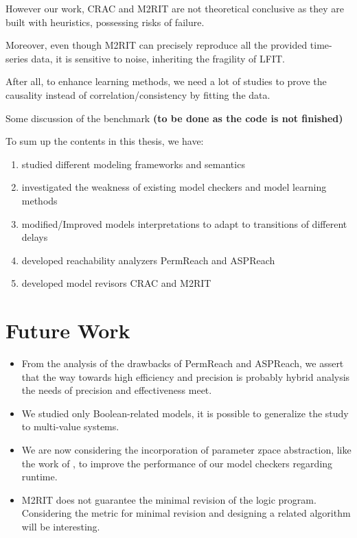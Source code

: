 However our work, CRAC and M2RIT are not theoretical conclusive as they are built with heuristics, possessing risks of failure.

Moreover, even though M2RIT can precisely reproduce all the provided time-series data, it is sensitive to noise, inheriting the fragility of LFIT.

After all, to enhance learning methods, we need a lot of studies to prove the causality instead of correlation/consistency by fitting the data.

Some discussion of the benchmark \textbf{(to be done as the code is not finished)}

To sum up the contents in this thesis, we have:

\begin{enumerate}
    \item studied different modeling frameworks and semantics
    \item investigated the weakness of existing model checkers and model learning methods
    \item modified/Improved models interpretations to adapt to transitions of different delays
    \item developed reachability analyzers PermReach and ASPReach
    \item developed model revisors CRAC and M2RIT
\end{enumerate}

\section{Future Work}

\begin{itemize}
    \item From the analysis of the drawbacks of PermReach and ASPReach, we assert that the way towards high efficiency and precision is probably hybrid analysis the needs of precision and effectiveness meet.

    \item We studied only Boolean-related models, it is possible to generalize the study to multi-value systems.
    \item We are now considering the incorporation of parameter zpace abstraction, like the work of \cite{PRNs-TCS18}, to
    improve the performance of our model checkers regarding runtime.
    \item M2RIT does not guarantee the minimal revision of the logic program.
    Considering the metric for minimal revision and designing a related algorithm will be interesting.
\end{itemize}